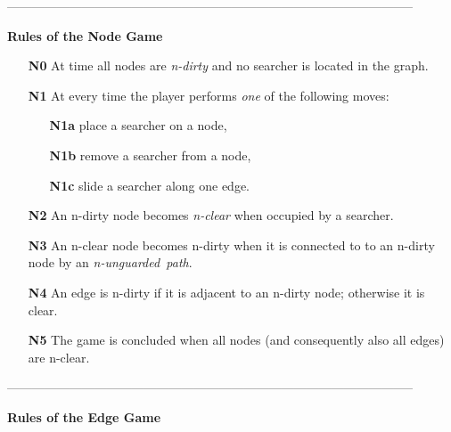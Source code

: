 \documentclass[11pt]{article}\usepackage{amsmath}
\begin{document}
\begin{center}
--------------------------------------------------------------------------------------------------

\textbf{Rules of the Node Game}
\end{center}

\begin{enumerate}
\item[\textbf{{N0}}] At time  all nodes are \emph{n-dirty} and no
searcher is located in the graph.

\item[\textbf{N1}] At every time  the player performs \emph{one} of
the following moves:

\begin{enumerate}
\item[\textbf{{N1a}}] place a searcher on a node,

\item[\textbf{{N1b}}] remove a searcher from a node,

\item[\textbf{{N1c}}] slide a searcher along one edge.
\end{enumerate}

\item[\textbf{{N2}}] An n-dirty node becomes \emph{n-clear }when occupied by a searcher.

\item[\textbf{{N3}}] An n-clear node  becomes n-dirty when it is connected
to to an n-dirty node  by an \emph{n-unguarded\ path}.

\item[\textbf{{N4}}] An edge is n-dirty if it is adjacent to an n-dirty node;
otherwise it is clear.

\item[\textbf{{N5}}] The game is concluded when all nodes (and consequently
also all edges) are n-clear.
\end{enumerate}

\begin{center}
--------------------------------------------------------------------------------------------------

\textbf{Rules of the Edge Game}
\end{center}
\end{document}
